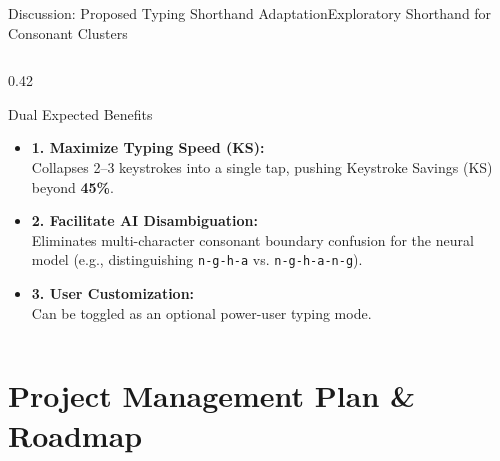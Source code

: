 \documentclass[aspectratio=169,10pt]{beamer}
\begin{document}
\begin{frame}{Discussion: Proposed Typing Shorthand Adaptation}{Exploratory Shorthand for Consonant Clusters}
\begin{columns}[T]
    \begin{column}{0.42\textwidth}
      \begin{exampleblock}{Dual Expected Benefits}
        \begin{itemize}\setlength{\itemsep}{3pt}\scriptsize
          \item \textbf{1. Maximize Typing Speed (KS):}\\
            Collapses 2--3 keystrokes into a single tap, pushing Keystroke Savings (KS) beyond \textbf{45\%}.
          \item \textbf{2. Facilitate AI Disambiguation:}\\
            Eliminates multi-character consonant boundary confusion for the neural model (e.g., distinguishing \texttt{n-g-h-a} vs. \texttt{n-g-h-a-n-g}).
          \item \textbf{3. User Customization:}\\
            Can be toggled as an optional power-user typing mode.
        \end{itemize}
      \end{exampleblock}
    \end{column}
  \end{columns}
\end{frame}

\section{Project Management Plan \& Roadmap}
\end{document}
